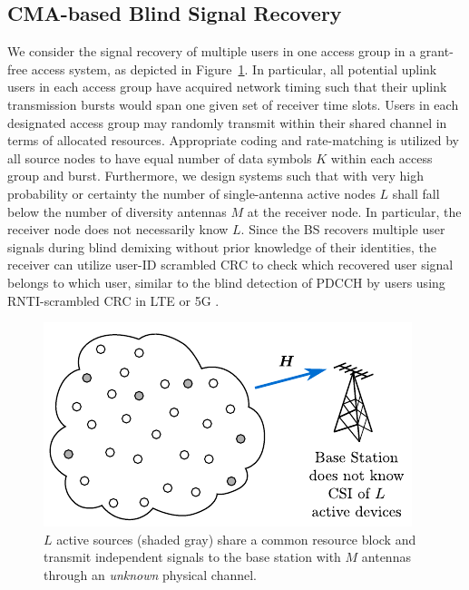 \subsection{CMA-based Blind Signal Recovery}\label{system:ssec:blind_recovery}
We consider the signal recovery of multiple users in one access group in a grant-free access system, as depicted in Figure~\ref{system:fig:general_model_access_control}. 
In particular, all potential uplink users in each access group have acquired network timing such that their uplink transmission bursts would span one given set of receiver time slots. 
Users in each designated access group may randomly transmit within their shared channel in terms of allocated resources. 
Appropriate coding and rate-matching is utilized by all source nodes to have equal number of data symbols $K$ within each access group and burst.
Furthermore, we design systems such that with very high probability or certainty the number of single-antenna active nodes $L$ shall fall below the number of diversity antennas $M$ at the receiver node. 
In particular, the receiver node does not necessarily know $L$.
Since the BS recovers multiple user signals during blind demixing without prior knowledge of their identities, the receiver can utilize user-ID scrambled CRC to check which recovered user signal belongs to which user, similar to the blind detection of PDCCH by users using RNTI-scrambled CRC in LTE or 5G \cite{ts36212,Jalali2020}. 

\begin{figure}[tbp]
	\centering
	\includegraphics[width=0.5\linewidth]{./figs/system_figs/general_model_access_control.pdf}
	\caption{$L$ active sources (shaded gray) share a common resource block and transmit independent signals to the base station with $M$ antennas through an \emph{unknown} physical channel.}\label{system:fig:general_model_access_control}
\end{figure}

